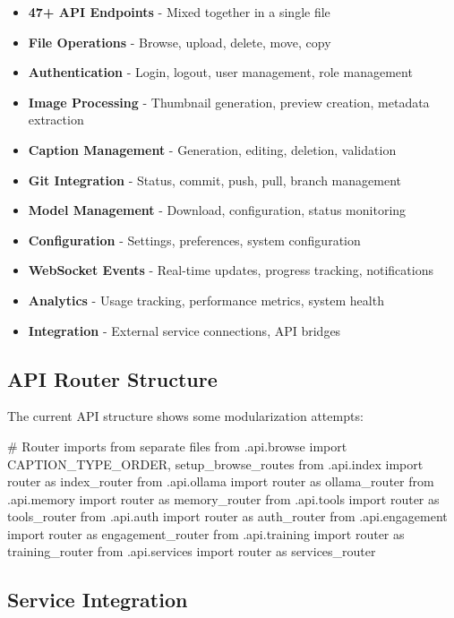\documentclass[11pt]{article}
\begin{document}
\begin{itemize}
\item \textbf{47+ API Endpoints} - Mixed together in a single file
\item \textbf{File Operations} - Browse, upload, delete, move, copy
\item \textbf{Authentication} - Login, logout, user management, role management
\item \textbf{Image Processing} - Thumbnail generation, preview creation, metadata extraction
\item \textbf{Caption Management} - Generation, editing, deletion, validation
\item \textbf{Git Integration} - Status, commit, push, pull, branch management
\item \textbf{Model Management} - Download, configuration, status monitoring
\item \textbf{Configuration} - Settings, preferences, system configuration
\item \textbf{WebSocket Events} - Real-time updates, progress tracking, notifications
\item \textbf{Analytics} - Usage tracking, performance metrics, system health
\item \textbf{Integration} - External service connections, API bridges
\end{itemize}

\subsection{API Router Structure}

The current API structure shows some modularization attempts:

\begin{typescriptcode}
# Router imports from separate files
from .api.browse import CAPTION_TYPE_ORDER, setup_browse_routes
from .api.index import router as index_router
from .api.ollama import router as ollama_router
from .api.memory import router as memory_router
from .api.tools import router as tools_router
from .api.auth import router as auth_router
from .api.engagement import router as engagement_router
from .api.training import router as training_router
from .api.services import router as services_router
\end{typescriptcode}

\subsection{Service Integration}
\end{document}
